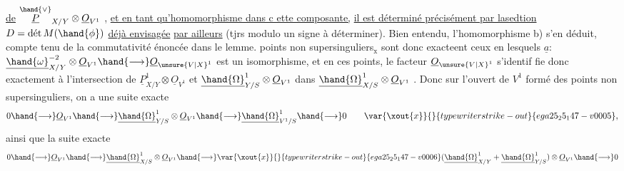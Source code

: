 
\uline{de} $\overset{\hand{\vee}}{\underline{P}}_{X/Y}\otimes\underline{O}_{V^1}$ , \uline{et en tant qu'homomorphisme dans c ette composante,}
\uline{il est déterminé précisément par lasedtion} $D = \text{dét}\,M(\hand{\phi})$ \uline{déjà envisagée}
\uline{par ailleurs} (tjrs modulo un signe à déterminer). Bien entendu,
l'homomorphisme b) s'en déduit, compte tenu de la commutativité énoncée
dans le lemme.  points non supersinguliers$_{\text{x}}$ sont donc exacteent
ceux en lesquels $\underline{a}$: $\underline{\hand{\omega}}^{-2}_{X/Y}\otimes\underline{O}_{V^1}\hand{\longrightarrow}\underline{O}_{\unsure{V|X}^1}$ est un isomorphisme, et en
ces points,  le facteur $\underline{O}_{\unsure{V|X}^1}$ s'identif
fie donc exactement à l'intersection de $\underline{P}^1_{X/Y}\otimes\underline{O}_{V^1}$ et $\underline{\hand{\Omega}}^1_{Y/S}\otimes\underline{O}_{V^1}$
dans $\underline{\hand{\Omega}}^1_{X/S}\otimes\underline{O}_{V^1}$ . Donc sur l'ouvert de $V^1$ formé des points non
supersinguliers, on a une suite exacte
\[ 0\hand{\longrightarrow}\underline{O}_{V^1}\hand{\longrightarrow}\underline{\hand{\Omega}}^1_{Y/S}\otimes\underline{O}_{V^1}\hand{\longrightarrow}\underline{\hand{\Omega}}^1_{V^1/S}\hand{\longrightarrow} 0 \qquad \var{\xout{x}}{}{typewriter strike-out}{ega25_25_147-v0005}, \]
ainsi que la suite exacte
\[ 0\hand{\longrightarrow}\underline{O}_{V^1}\hand{\longrightarrow}\underline{\hand{\Omega}}^1_{X/S}\otimes\underline{O}_{V^1}\hand{\longrightarrow}\var{\xout{x}}{}{typewriter strike-out}{ega25_25_147-v0006}(\underline{\hand{\Omega}}^1_{X/Y}+\underline{\hand{\Omega}}^1_{Y/S})\otimes\underline{O}_{V^1}\hand{\longrightarrow} 0 \]

